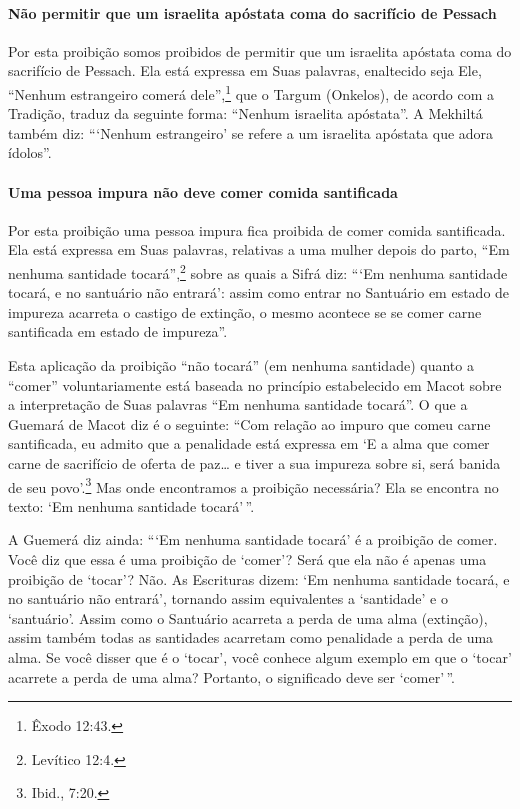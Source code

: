 \paragraph{Não permitir que um israelita apóstata coma do sacrifício de Pessach}

Por esta proibição somos proibidos de permitir que um israelita
apóstata coma do sacrifício de Pessach. Ela está expressa em Suas
palavras, enaltecido seja Ele, ``Nenhum estrangeiro comerá dele'',\footnote{Êxodo 12:43.} que o Targum
(Onkelos), de acordo com a Tradição, traduz da seguinte forma: ``Nenhum
israelita apóstata''. A Mekhiltá também diz: ```Nenhum estrangeiro' se
refere a um israelita apóstata que adora ídolos''.

\paragraph{Uma pessoa impura não deve comer comida santificada}

Por esta proibição uma pessoa impura fica proibida de comer comida
santificada. Ela está expressa em Suas palavras, relativas a uma mulher
depois do parto, ``Em nenhuma santidade tocará'',\footnote{Levítico 12:4.} sobre
as quais a Sifrá diz: ```Em nenhuma santidade tocará, e no santuário não
entrará': assim como entrar no Santuário em estado de impureza acarreta
o castigo de extinção, o mesmo acontece se se comer carne santificada em
estado de impureza''.

Esta aplicação da proibição ``não tocará'' (em nenhuma santidade) quanto
a ``comer'' voluntariamente está baseada no princípio estabelecido em
Macot sobre a interpretação de Suas palavras ``Em nenhuma santidade
tocará''. O que a Guemará de Macot diz é o seguinte: ``Com relação ao
impuro que comeu carne santificada, eu admito que a penalidade está
expressa em `E a alma que comer carne de sacrifício de oferta de paz\ldots{}
e tiver a sua impureza sobre si, será banida de seu povo'.\footnote{Ibid., 7:20.}
Mas onde encontramos a proibição necessária? Ela se encontra no texto:
`Em nenhuma santidade tocará'\,''.

A Guemerá diz ainda: ```Em nenhuma santidade tocará' é a proibição de
comer. Você diz que essa é uma proibição de `comer'? Será que ela não é
apenas uma proibição de `tocar'? Não. As Escrituras dizem: `Em nenhuma
santidade tocará, e no santuário não entrará', tornando assim
equivalentes a `santidade' e o `santuário'. Assim como o Santuário
acarreta a perda de uma alma (extinção), assim também todas as
santidades acarretam como penalidade a perda de uma alma. Se você disser
que é o `tocar', você conhece algum exemplo em que o `tocar' acarrete a
perda de uma alma? Portanto, o significado deve ser `comer'\,''.

